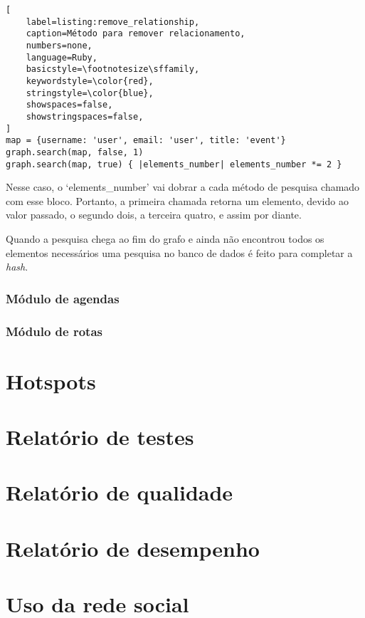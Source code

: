 \begin{lstlisting}[
    label=listing:remove_relationship,
    caption=Método para remover relacionamento,
    numbers=none,
    language=Ruby,
    basicstyle=\footnotesize\sffamily,
    keywordstyle=\color{red},
    stringstyle=\color{blue},
    showspaces=false,
    showstringspaces=false,
]
map = {username: 'user', email: 'user', title: 'event'}
graph.search(map, false, 1)
graph.search(map, true) { |elements_number| elements_number *= 2 }
\end{lstlisting}


Nesse caso, o `elements\_number' vai dobrar a cada método de pesquisa chamado com esse bloco. Portanto, a primeira chamada retorna um elemento, devido ao valor passado, o segundo dois, a terceira quatro, e assim por diante.

Quando a pesquisa chega ao fim do grafo e ainda não encontrou todos os elementos necessários uma pesquisa no banco de dados é feito para completar a \textit{hash}.

\subsubsection{Módulo de agendas}

\subsubsection{Módulo de rotas}

\section{Hotspots}

\section{Relatório de testes}

\section{Relatório de qualidade}

\section{Relatório de desempenho}



\section{Uso da rede social}
